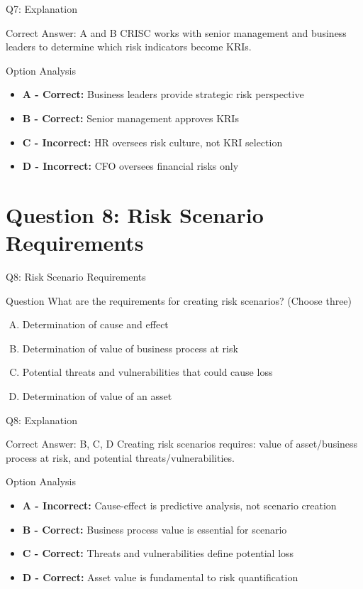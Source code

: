 \documentclass{beamer}
\begin{document}
	\begin{frame}{Q7: Explanation}
		\begin{block}{Correct Answer: A and B}
			CRISC works with senior management and business leaders to determine which risk indicators become KRIs.
		\end{block}
		\begin{block}{Option Analysis}
			\begin{itemize}
				\item \textbf{A - Correct:} Business leaders provide strategic risk perspective
				\item \textbf{B - Correct:} Senior management approves KRIs
				\item \textbf{C - Incorrect:} HR oversees risk culture, not KRI selection
				\item \textbf{D - Incorrect:} CFO oversees financial risks only
			\end{itemize}
		\end{block}
	\end{frame}
	
	\section{Question 8: Risk Scenario Requirements}
	
	\begin{frame}{Q8: Risk Scenario Requirements}
		\begin{block}{Question}
			What are the requirements for creating risk scenarios? (Choose three)
		\end{block}
		\begin{enumerate}[(A)]
			\item Determination of cause and effect
			\item Determination of value of business process at risk
			\item Potential threats and vulnerabilities that could cause loss
			\item Determination of value of an asset
		\end{enumerate}
	\end{frame}
	
	\begin{frame}{Q8: Explanation}
		\begin{block}{Correct Answer: B, C, D}
			Creating risk scenarios requires: value of asset/business process at risk, and potential threats/vulnerabilities.
		\end{block}
		\begin{block}{Option Analysis}
			\begin{itemize}
				\item \textbf{A - Incorrect:} Cause-effect is predictive analysis, not scenario creation
				\item \textbf{B - Correct:} Business process value is essential for scenario
				\item \textbf{C - Correct:} Threats and vulnerabilities define potential loss
				\item \textbf{D - Correct:} Asset value is fundamental to risk quantification
			\end{itemize}
		\end{block}
	\end{frame}
	
\end{document}
